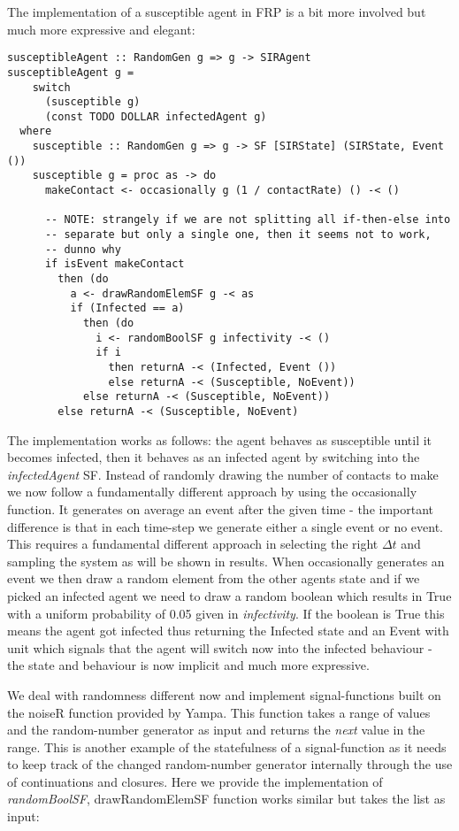 The implementation of a susceptible agent in FRP is a bit more involved but much more expressive and elegant:

\begin{verbatim}
susceptibleAgent :: RandomGen g => g -> SIRAgent
susceptibleAgent g = 
    switch 
      (susceptible g) 
      (const TODO DOLLAR infectedAgent g)
  where
    susceptible :: RandomGen g => g -> SF [SIRState] (SIRState, Event ())
    susceptible g = proc as -> do
      makeContact <- occasionally g (1 / contactRate) () -< ()

      -- NOTE: strangely if we are not splitting all if-then-else into
      -- separate but only a single one, then it seems not to work,
      -- dunno why
      if isEvent makeContact
        then (do
          a <- drawRandomElemSF g -< as
          if (Infected == a)
            then (do
              i <- randomBoolSF g infectivity -< ()
              if i
                then returnA -< (Infected, Event ())
                else returnA -< (Susceptible, NoEvent))
            else returnA -< (Susceptible, NoEvent))
        else returnA -< (Susceptible, NoEvent)
\end{verbatim}

The implementation works as follows: the agent behaves as susceptible until it becomes infected, then it behaves as an infected agent by switching into the \textit{infectedAgent} SF.
Instead of randomly drawing the number of contacts to make we now follow a fundamentally different approach by using the occasionally function. It generates on average an event after the given time - the important difference is that in each time-step we generate either a single event or no event. This requires a fundamental different approach in selecting the right $\Delta t$ and sampling the system as will be shown in results.
When occasionally generates an event we then draw a random element from the other agents state and if we picked an infected agent we need to draw a random boolean which results in True with a uniform probability of 0.05 given in \textit{infectivity}. If the boolean is True this means the agent got infected thus returning the Infected state and an Event with unit which signals that the agent will switch now into the infected behaviour - the state and behaviour is now implicit and much more expressive.

We deal with randomness different now and implement signal-functions built on the noiseR function provided by Yampa. This function takes a range of values and the random-number generator as input and returns the \textit{next} value in the range. This is another example of the statefulness of a signal-function as it needs to keep track of the changed random-number generator internally through the use of continuations and closures. Here we provide the implementation of \textit{randomBoolSF}, drawRandomElemSF function works similar but takes the list as input:

